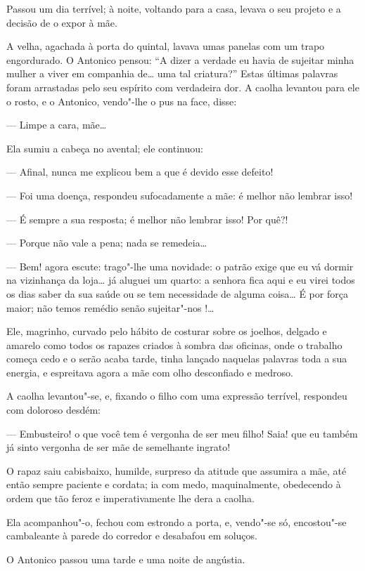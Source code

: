 Passou um dia terrível; à noite, voltando para a casa, levava o seu
projeto e a decisão de o expor à mãe.

A velha, agachada à porta do quintal, lavava umas panelas com um trapo
engordurado. O Antonico pensou: ``A dizer a verdade eu havia de sujeitar
minha mulher a viver em companhia de\ldots{} uma tal criatura?'' Estas
últimas palavras foram arrastadas pelo seu espírito com verdadeira dor.
A caolha levantou para ele o rosto, e o Antonico, vendo"-lhe o pus na
face, disse:

--- Limpe a cara, mãe\ldots{}

Ela sumiu a cabeça no avental; ele continuou:

--- Afinal, nunca me explicou bem a que é devido esse defeito!

--- Foi uma doença, respondeu sufocadamente a mãe: é melhor não lembrar
isso!

--- É sempre a sua resposta; é melhor não lembrar isso! Por quê?!

--- Porque não vale a pena; nada se remedeia\ldots{}

--- Bem! agora escute: trago"-lhe uma novidade: o patrão exige que eu vá
dormir na vizinhança da loja\ldots{} já aluguei um quarto: a senhora fica
aqui e eu virei todos os dias saber da sua saúde ou se tem necessidade
de alguma coisa\ldots{} É por força maior; não temos remédio senão
sujeitar"-nos !\ldots{}

Ele, magrinho, curvado pelo hábito de costurar sobre os joelhos, delgado
e amarelo como todos os rapazes criados à sombra das oficinas, onde o
trabalho começa cedo e o serão acaba tarde, tinha lançado naquelas
palavras toda a sua energia, e espreitava agora a mãe com olho
desconfiado e medroso.

A caolha levantou"-se, e, fixando o filho com uma expressão terrível,
respondeu com doloroso desdém:

--- Embusteiro! o que você tem é vergonha de ser meu filho! Saia! que eu
também já sinto vergonha de ser mãe de semelhante ingrato!

O rapaz saiu cabisbaixo, humilde, surpreso da atitude que assumira a
mãe, até então sempre paciente e cordata; ia com medo, maquinalmente,
obedecendo à ordem que tão feroz e imperativamente lhe dera a caolha.

Ela acompanhou"-o, fechou com estrondo a porta, e, vendo"-se só,
encostou"-se cambaleante à parede do corredor e desabafou em soluços.

O Antonico passou uma tarde e uma noite de angústia.

